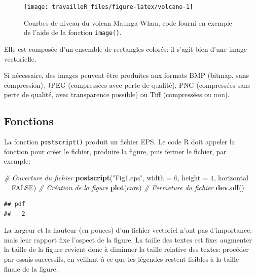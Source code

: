 \documentclass[
  12pt,
  french,
  a4paper,
  extrafontsizes,onecolumn,openright
  ]{memoir}
\newenvironment{Shaded}{\begin{snugshade}}{\end{snugshade}}
\newcommand{\CommentTok}[1]{\textcolor[rgb]{0.56,0.35,0.01}{\textit{#1}}}
\newcommand{\DataTypeTok}[1]{\textcolor[rgb]{0.13,0.29,0.53}{#1}}
\newcommand{\DecValTok}[1]{\textcolor[rgb]{0.00,0.00,0.81}{#1}}
\newcommand{\KeywordTok}[1]{\textcolor[rgb]{0.13,0.29,0.53}{\textbf{#1}}}
\newcommand{\NormalTok}[1]{#1}
\newcommand{\OtherTok}[1]{\textcolor[rgb]{0.56,0.35,0.01}{#1}}
\newcommand{\StringTok}[1]{\textcolor[rgb]{0.31,0.60,0.02}{#1}}
\begin{document}
\begin{figure}

{\centering \texttt{[image: travailleR\_files/figure-latex/volcano-1]} 

}

\caption{Courbes de niveau du volcan Maunga Whau, code fourni en exemple de l'aide de la fonction \texttt{image()}.}\label{fig:volcano}
\end{figure}

\normalsize

Elle est composée d'un ensemble de rectangles colorés: il s'agit bien d'une image vectorielle.

Si nécessaire, des images peuvent être produites aux formats BMP (bitmap, sans compression), JPEG (compressées avec perte de qualité), PNG (compressées sans perte de qualité, avec transparence possible) ou Tiff (compressées ou non).

\hypertarget{fonctions}{%
\subsection{Fonctions}\label{fonctions}}

La fonction \texttt{postscript()} produit un fichier EPS.
Le code R doit appeler la fonction pour créer le fichier, produire la figure, puis fermer le fichier, par exemple:

\scriptsize

\begin{Shaded}
\begin{Highlighting}[]
\CommentTok{# Ouverture du fichier}
\KeywordTok{postscript}\NormalTok{(}\StringTok{"Fig1.eps"}\NormalTok{, }\DataTypeTok{width =} \DecValTok{6}\NormalTok{, }\DataTypeTok{height =} \DecValTok{4}\NormalTok{, }\DataTypeTok{horizontal =} \OtherTok{FALSE}\NormalTok{)}
\CommentTok{# Création de la figure}
\KeywordTok{plot}\NormalTok{(cars)}
\CommentTok{# Fermeture du fichier}
\KeywordTok{dev.off}\NormalTok{()}
\end{Highlighting}
\end{Shaded}

\begin{verbatim}
## pdf 
##   2
\end{verbatim}

\normalsize

La largeur et la hauteur (en pouces) d'un fichier vectoriel n'ont pas d'importance, mais leur rapport fixe l'aspect de la figure.
La taille des textes est fixe: augmenter la taille de la figure revient donc à diminuer la taille relative des textes: procéder par essais successifs, en veillant à ce que les légendes restent lisibles à la taille finale de la figure.
\end{document}
